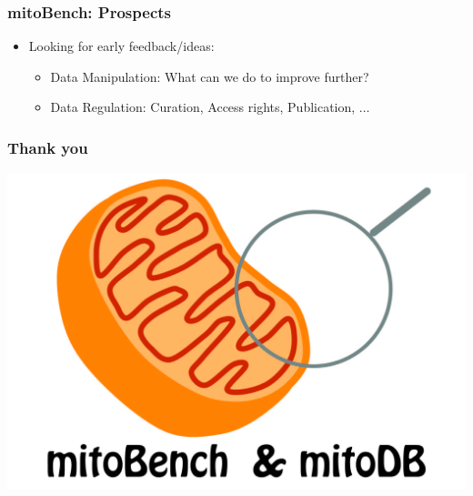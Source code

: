 \documentclass{beamer} %
\begin{document}
\begin{frame}
\frametitle{mitoBench: Prospects}
\begin{itemize}
\item Looking for early feedback/ideas:
\begin{itemize}
\item Data Manipulation: What can we do to improve further? 
\item Data Regulation: Curation, Access rights, Publication, $\ldots$
\end{itemize}
\end{itemize}
\end{frame}

\begin{frame}
\frametitle{Thank you}
\centering
\includegraphics[scale=0.1]{imagesBench/mitoBenchLogo.jpg}
\end{frame}
\end{document}
